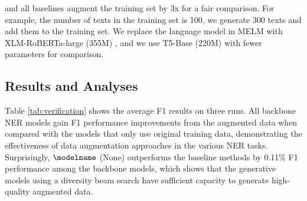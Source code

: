 {\modelname} and all baselines augment the training set by 3x for a fair comparison. For example, the number of texts in the training set is 100, we generate 300 texts and add them to the training set. We replace the language model in MELM \cite{zhou2022melm} with XLM-RoBERTa-large (355M) \cite{conneau2020unsupervised}, and we use T5-Base (220M) with fewer parameters for comparison.

\subsection{Results and Analyses}
Table \ref{tab:verification} shows the average F1 results on three runs. All backbone NER models gain F1 performance improvements from the augmented data when compared with the models that only use original training data, demonstrating the effectiveness of data augmentation approaches in the various NER tasks.
Surprisingly, ${\modelname}$ (None) outperforms the baseline methods by 0.11\% F1 performance among the backbone models, which shows that the generative models using a diversity beam search have sufficient capacity to generate high-quality augmented data. 

